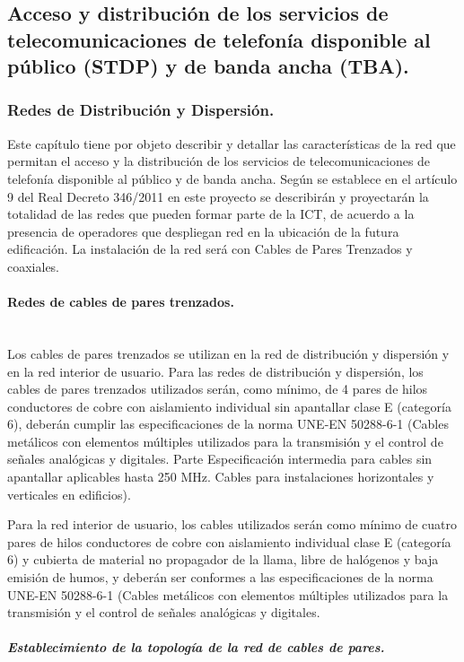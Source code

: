 \subsection{Acceso y distribución de los servicios de telecomunicaciones de telefonía disponible al público (STDP) y de banda ancha (TBA).}
\subsubsection{Redes de Distribución y Dispersión.}
Este capítulo tiene por objeto describir y detallar las características de la red que permitan el
acceso y la distribución de los servicios de telecomunicaciones de telefonía disponible al público y
de banda ancha.
Según se establece en el artículo 9 del Real Decreto 346/2011 en este proyecto se describirán y
proyectarán la totalidad de las redes que pueden formar parte de la ICT, de acuerdo a la
presencia de operadores que despliegan red en la ubicación de la futura edificación.
La instalación de la red será con Cables de Pares Trenzados y coaxiales.
\paragraph{Redes de cables de pares trenzados.}\textbf{}\\
Los cables de pares trenzados se utilizan en la red de distribución y
dispersión y en la red interior de usuario.
Para las redes de distribución y dispersión, los cables de pares trenzados
utilizados serán, como mínimo, de 4 pares de hilos conductores de cobre con
aislamiento individual sin apantallar clase E (categoría 6), deberán cumplir las
especificaciones de la norma UNE-EN 50288-6-1 (Cables metálicos con
elementos múltiples utilizados para la transmisión y el control de señales
analógicas y digitales. Parte Especificación intermedia para cables sin
apantallar aplicables hasta 250 MHz. Cables para instalaciones horizontales y
verticales en edificios).

Para la red interior de usuario, los cables utilizados serán como mínimo de
cuatro pares de hilos conductores de cobre con aislamiento individual clase E
(categoría 6) y cubierta de material no propagador de la llama, libre de
halógenos y baja emisión de humos, y deberán ser conformes a las
especificaciones de la norma UNE-EN 50288-6-1 (Cables metálicos con
elementos múltiples utilizados para la transmisión y el control de señales
analógicas y digitales. 
\subparagraph{Establecimiento de la topología de la red de cables de pares.}


